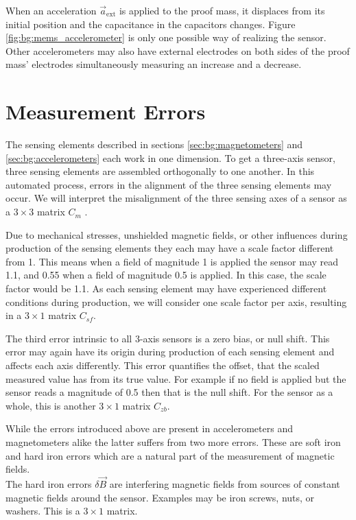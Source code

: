 When an acceleration $\vec{a}_{\mathrm{ext}}$ is applied to the proof mass, it displaces from its initial position and the capacitance in the capacitors changes. Figure \ref{fig:bg:mems_accelerometer} is only one possible way of realizing the sensor. Other accelerometers may also have external electrodes on both sides of the proof mass' electrodes simultaneously measuring an increase and a decrease. 


\section{Measurement Errors \label{sec:bg:measurement_errors}}
The sensing elements described in sections \ref{sec:bg:magnetometers} and \ref{sec:bg:accelerometers} each work in one dimension. To get a three-axis sensor, three sensing elements are assembled orthogonally to one another. In this automated process, errors in the alignment of the three sensing elements may occur. We will interpret the misalignment of the three sensing axes of a sensor as a $3\times3$ matrix $C_{m}$ \cite{magcal}\cite{non-orthonogality}.

Due to mechanical stresses, unshielded magnetic fields, or other influences during production of the sensing elements they each may have a scale factor different from 1. This means when a field of magnitude 1 is applied the sensor may read 1.1, and 0.55 when a field of magnitude 0.5 is applied. In this case, the scale factor would be 1.1. As each sensing element may have experienced different conditions during production, we will consider one scale factor per axis, resulting in a $3\times1$ matrix $C_{sf}$.

The third error intrinsic to all 3-axis sensors is a zero bias, or null shift. This error may again have its origin during production of each sensing element and affects each axis differently. This error quantifies the offset, that the scaled measured value has from its true value. For example if no field is applied but the sensor reads a magnitude of 0.5 then that is the null shift. For the sensor as a whole, this is another $3\times1$ matrix $C_{zb}$.

While the errors introduced above are present in accelerometers and magnetometers alike the latter suffers from two more errors. These are soft iron and hard iron errors which are a natural part of the measurement of magnetic fields.\\
The hard iron errors $\delta\vec{B}$ are interfering magnetic fields from sources of constant magnetic fields around the sensor. Examples may be iron screws, nuts, or washers. This is a $3\times1$ matrix.

